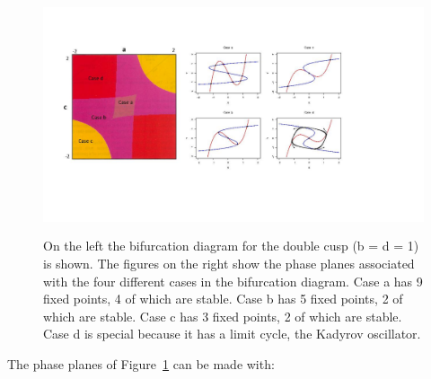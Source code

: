 \documentclass[
  letterpaper,
]{scrbook}
\begin{document}
\begin{figure}

{\centering \includegraphics[width=6.05694in,height=2.75862in]{media/ch5/image16.jpg}

}

\caption{\label{fig-ch5-img16-old-64}On the left the bifurcation diagram
for the double cusp (b = d = 1) is shown. The figures on the right show
the phase planes associated with the four different cases in the
bifurcation diagram. Case a has 9 fixed points, 4 of which are stable.
Case b has 5 fixed points, 2 of which are stable. Case c has 3 fixed
points, 2 of which are stable. Case d is special because it has a limit
cycle, the Kadyrov oscillator.}

\end{figure}

The phase planes of Figure~\ref{fig-ch5-img16-old-64} can be made with:
\end{document}
